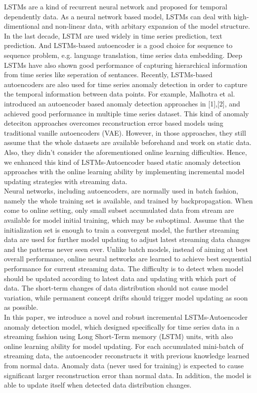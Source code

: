 LSTMs are a kind of recurrent neural network and proposed for temporal dependently data. As a neural network based model, LSTMs can deal with high-dimentional and non-linear data, with arbitary expansion of the model structure. In the last decade, LSTM are used widely in time series prediction, text prediction. And LSTMs-based autoencoder is a good choice for sequence to sequence problem, e.g. language translation, time series data embedding. Deep LSTMs have also shown good performance of capturing hierarchical information from time series like seperation of sentances. Recently, LSTMs-based autoencoders are also used for time series anomaly detection in order to capture the temporal information between data points. For example, Malhotra et al. introduced an autoencoder based anomaly detection approaches in [1],[2], and achieved good performance in multiple time series dataset. This kind of anomaly deteciton approaches overcomes reconstruction error based models using traditional vanille autoencoders (VAE). However, in those approaches, they still assume that the whole datasets are available beforehand and work on static data. Also, they didn’t consider the aforementioned online learning difficulties. Hence, we enhanced this kind of LSTMs-Autoencoder based static anomaly detection approaches with the online learning ability by implementing incremental model updating strategies with streaming data.\\

Neural networks, including autoencoders, are normally used in batch fashion, namely the whole training set is available, and trained by backpropagation. When come to online setting, only small subset accumulated data from stream are available for model initial training, which may be suboptimal. Assume that the initialization set is enough to train a convergent model, the further streaming data are used for further model updating to adjust latest streaming data changes and the patterns never seen ever. Unlike batch models, instead of aiming at best overall performance, online neural networks are learned to achieve best sequential performance for current streaming data. The difficulty is to detect when model should be updated according to latest data and updating with which part of data. The short-term changes of data distribution should not cause model variation, while permanent concept drifts should trigger model updating as soon as possible.\\

In this paper, we introduce a novel and robust incremental LSTMs-Autoencoder anomaly detection model, which designed specifically for time series data in a streaming fashion using Long Short-Term memory (LSTM) units, with also online learning ability for model updating. For each accumulated mini-batch of streaming data, the autoencoder reconstructs it with previous knowledge learned from normal data. Anomaly data (never used for training) is expected to cause significant larger reconstruction error than normal data. In addition, the model is able to update itself when detected data distribution changes.\\

